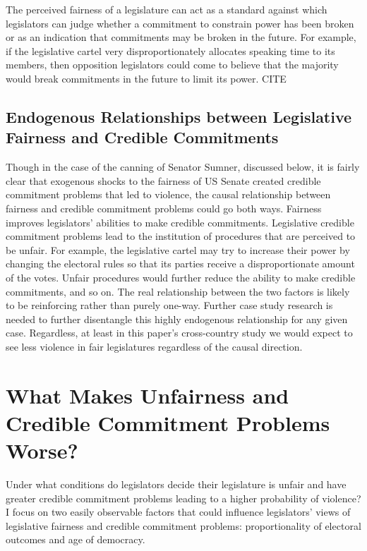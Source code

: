 \documentclass[a4paper]{article}\usepackage[]{graphicx}\usepackage[]{color}
\begin{document}
The perceived fairness of a legislature can act as a standard against which legislators can judge whether a commitment to constrain power has been broken or as an indication that commitments may be broken in the future. For example, if the legislative cartel very disproportionately allocates speaking time to its members, then opposition legislators could come to believe that the majority would break commitments in the future to limit its power. CITE

\subsection{Endogenous Relationships between Legislative Fairness and Credible Commitments}

Though in the case of the canning of Senator Sumner, discussed below, it is fairly clear that exogenous shocks to the fairness of US Senate created credible commitment problems that led to violence, the causal relationship between fairness and credible commitment problems could go both ways. Fairness improves legislators' abilities to make credible commitments. Legislative credible commitment problems lead to the institution of procedures that are perceived to be unfair. For example, the legislative cartel may try to increase their power by changing the electoral rules so that its parties receive a disproportionate amount of the votes. Unfair procedures would further reduce the ability to make credible commitments, and so on. The real relationship between the two factors is likely to be reinforcing rather than purely one-way. Further case study research is needed to further disentangle this highly endogenous relationship for any given case. Regardless, at least in this paper's cross-country study we would expect to see less violence in fair legislatures regardless of the causal direction.

\section{What Makes Unfairness and Credible Commitment Problems Worse?}

Under what conditions do legislators decide their legislature is unfair and have greater credible commitment problems leading to a higher probability of violence? I focus on two easily observable factors that could influence legislators' views of legislative fairness and credible commitment problems: proportionality of electoral outcomes and age of democracy.
\end{document}
